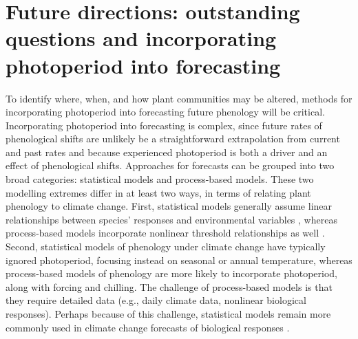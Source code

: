 \documentclass{article}
\begin{document}
\section*{Future directions: outstanding questions and incorporating photoperiod into forecasting}
\par  To identify where, when, and how plant communities may be altered, methods for incorporating photoperiod into forecasting future phenology will be critical. Incorporating photoperiod into forecasting is complex, since future rates of phenological shifts are unlikely be a straightforward extrapolation from current and past rates and because experienced photoperiod is both a driver and an effect of phenological shifts. Approaches for forecasts can be grouped into two broad categories: statistical models and process-based models. These two modelling extremes differ in at least two ways, in terms of relating plant phenology to climate change. First, statistical models generally assume linear relationships between species' responses and environmental variables \citep[e.g., OTHER EXAMPLES][]{flynn2018}, whereas process-based models incorporate nonlinear threshold relationships as well \citep[e.g.][]{chuine2001,morin2009}. Second, statistical models of phenology under climate change have typically ignored photoperiod, focusing instead on seasonal or annual temperature, %
whereas process-based models of phenology are more likely to incorporate photoperiod, along with forcing and chilling. The challenge of process-based models is that they require detailed data (e.g., daily climate data, nonlinear biological responses). Perhaps because of this challenge, statistical models remain more commonly used in climate change forecasts of biological responses \citep[e.g.,][]{Basler:2012}.%
%   
\end{document}
